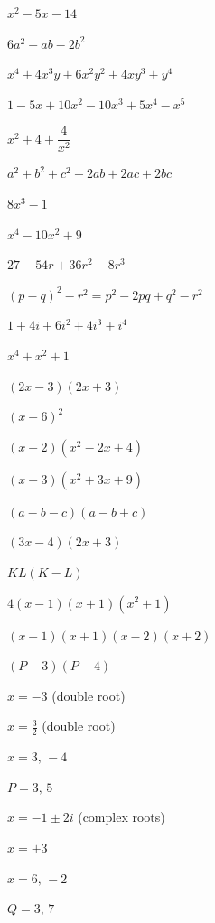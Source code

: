 \begin{solutions}
  \item $x^{2}-5x-14$
  \item $6a^{2}+ab-2b^{2}$
  \item $x^{4}+4x^{3}y+6x^{2}y^{2}+4xy^{3}+y^{4}$
  \item $1-5x+10x^{2}-10x^{3}+5x^{4}-x^{5}$
  \item $x^{2}+4+\dfrac{4}{x^{2}}$
  \item $a^{2}+b^{2}+c^{2}+2ab+2ac+2bc$
  \item $8x^{3}-1$
  \item $x^{4}-10x^{2}+9$
  \item $27-54r+36r^{2}-8r^{3}$
  \item $(p-q)^{2}-r^{2}=p^{2}-2pq+q^{2}-r^{2}$
  \item $1+4i+6i^{2}+4i^{3}+i^{4}$
  \item $x^{4}+x^{2}+1$
  \item $(2x-3)(2x+3)$
  \item $(x-6)^{2}$
  \item $(x+2)(x^{2}-2x+4)$
  \item $(x-3)(x^{2}+3x+9)$
  \item $(a-b-c)(a-b+c)$
  \item $(3x-4)(2x+3)$
  \item $KL(K-L)$
  \item $4(x-1)(x+1)(x^{2}+1)$
  \item $(x-1)(x+1)(x-2)(x+2)$
  \item $(P-3)(P-4)$
  \item $x=-3$ (double root)
  \item $x=\tfrac32$ (double root)
  \item $x=3,\,-4$
  \item $P=3,\,5$
  \item $x=-1\pm 2i$ (complex roots)
  \item $x=\pm 3$
  \item $x=6,\,-2$
  \item $Q=3,\,7$
\end{solutions}
